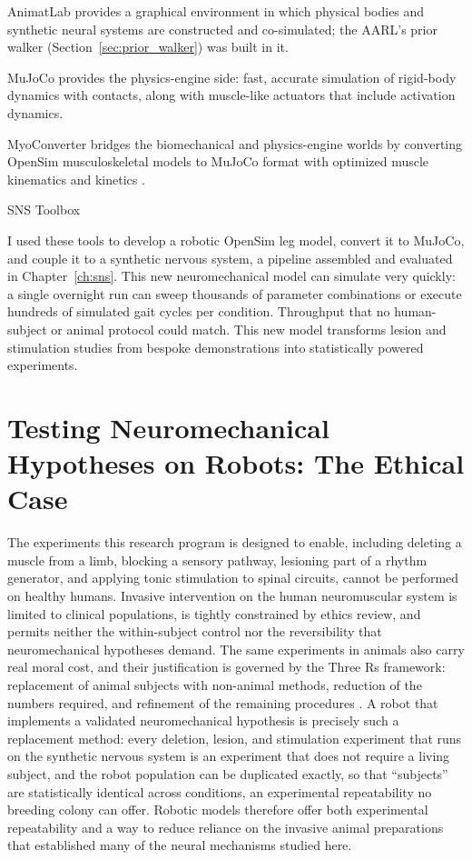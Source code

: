 AnimatLab \citep{cofer_animatlab_2010} provides a graphical environment in which physical bodies and synthetic neural systems are constructed and co-simulated; the AARL's prior walker (Section~\ref{sec:prior_walker}) was built in it. 

MuJoCo \citep{todorov_mujoco_2012} provides the physics-engine side: fast, accurate simulation of rigid-body dynamics with contacts, along with muscle-like actuators that include activation dynamics. 

MyoConverter bridges the biomechanical and physics-engine worlds by converting OpenSim musculoskeletal models to MuJoCo format with optimized muscle kinematics and kinetics \citep{caggiano_myosuite_2022, wang_myosim_2022}. 

SNS Toolbox \citep{nourse_sns_2023}

I used these tools to develop a robotic OpenSim leg model, convert it to MuJoCo, and couple it to a synthetic nervous system, a pipeline assembled and evaluated in Chapter~\ref{ch:sns}. This new neuromechanical model can simulate very quickly: a single overnight run can sweep thousands of parameter combinations or execute hundreds of simulated gait cycles per condition. Throughput that no human-subject or animal protocol could match. This new model transforms lesion and stimulation studies from bespoke demonstrations into statistically powered experiments.

\section{Testing Neuromechanical Hypotheses on Robots: The Ethical Case}\label{sec:bg_ethics}

The experiments this research program is designed to enable, including deleting a muscle from a limb, blocking a sensory pathway, lesioning part of a rhythm generator, and applying tonic stimulation to spinal circuits, cannot be performed on healthy humans. Invasive intervention on the human neuromuscular system is limited to clinical populations, is tightly constrained by ethics review, and permits neither the within-subject control nor the reversibility that neuromechanical hypotheses demand. The same experiments in animals also carry real moral cost, and their justification is governed by the Three Rs framework: replacement of animal subjects with non-animal methods, reduction of the numbers required, and refinement of the remaining procedures \citep{russell_principles_1959, tannenbaum_russell_2015}. A robot that implements a validated neuromechanical hypothesis is precisely such a replacement method: every deletion, lesion, and stimulation experiment that runs on the synthetic nervous system is an experiment that does not require a living subject, and the robot population can be duplicated exactly, so that ``subjects'' are statistically identical across conditions, an experimental repeatability no breeding colony can offer. Robotic models therefore offer both experimental repeatability and a way to reduce reliance on the invasive animal preparations that established many of the neural mechanisms studied here.

